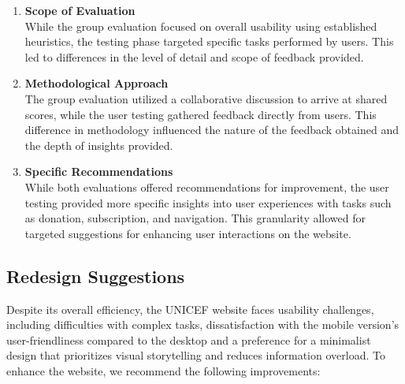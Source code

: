 \textbf{\color{unicefRed}{Differences}}
\begin{enumerate}
\item  \textbf{Scope of Evaluation} \\
While the group evaluation focused on overall usability using established heuristics, the testing phase targeted specific tasks performed by users. 
This led to differences in the level of detail and scope of feedback provided.

\item \textbf{Methodological Approach} \\
The group evaluation utilized a collaborative discussion to arrive at shared scores, while the user testing gathered feedback directly from users. 
This difference in methodology influenced the nature of the feedback obtained and the depth of insights provided.

\item \textbf{Specific Recommendations} \\
While both evaluations offered recommendations for improvement, the user testing provided more specific insights into user experiences with tasks such as donation, subscription, and navigation. 
This granularity allowed for targeted suggestions for enhancing user interactions on the website.
\end{enumerate}

\newpage
\subsection{Redesign Suggestions}
Despite its overall efficiency, the UNICEF website faces usability challenges, including difficulties with complex tasks, dissatisfaction with the mobile version's user-friendliness compared to the desktop and a preference for a minimalist design that prioritizes visual storytelling and reduces information overload.
To enhance the website, we recommend the following improvements:


